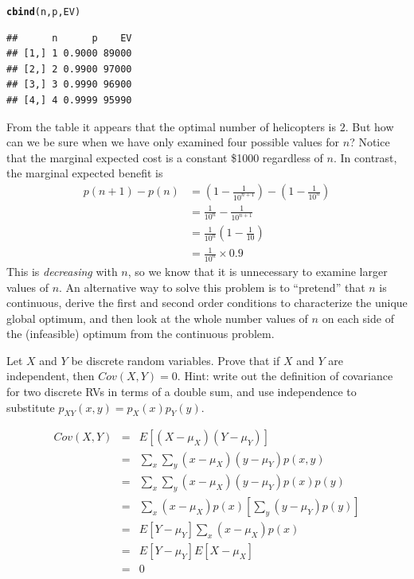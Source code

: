 \documentclass[addpoints,12pt]{exam}\usepackage[]{graphicx}\usepackage[]{xcolor}
\makeatletter
\newcommand{\hldef}[1]{\textcolor[rgb]{0.345,0.345,0.345}{#1}}%
\newcommand{\hlkwd}[1]{\textcolor[rgb]{0.737,0.353,0.396}{\textbf{#1}}}%
\newenvironment{kframe}{%
 \def\at@end@of@kframe{}%
 \ifinner\ifhmode%
  \def\at@end@of@kframe{\end{minipage}}%
  \begin{minipage}{\columnwidth}%
 \fi\fi%
 \def\FrameCommand##1{\hskip\@totalleftmargin \hskip-\fboxsep
 \colorbox{shadecolor}{##1}\hskip-\fboxsep
     \hskip-\linewidth \hskip-\@totalleftmargin \hskip\columnwidth}%
 \MakeFramed {\advance\hsize-\width
   \@totalleftmargin\z@ \linewidth\hsize
   \@setminipage}}%
 {\par\unskip\endMakeFramed%
 \at@end@of@kframe}
\newenvironment{knitrout}{}{} %
\makeatother
\begin{document}
\begin{questions}
\begin{solution}
\begin{knitrout}
\begin{kframe}
\begin{alltt}
\hlkwd{cbind}\hldef{(n,p,EV)}
\end{alltt}
\begin{verbatim}
##      n      p    EV
## [1,] 1 0.9000 89000
## [2,] 2 0.9900 97000
## [3,] 3 0.9990 96900
## [4,] 4 0.9999 95990
\end{verbatim}
\end{kframe}
\end{knitrout}
From the table it appears that the optimal number of helicopters is $2$.
But how can we be sure when we have only examined four possible values for $n$?
Notice that the marginal expected cost is a constant \$1000 regardless of $n$.
In contrast, the marginal expected benefit is
\begin{align*}
  p(n+1) - p(n) &= \left( 1 - \frac{1}{10^{n+1}} \right) - \left( 1 - \frac{1}{10^{n}} \right) \\
  &= \frac{1}{10^{n}} - \frac{1}{10^{n+1}}\\
  &= \frac{1}{10^{n}}\left(1 - \frac{1}{10} \right) \\
  &= \frac{1}{10^n} \times 0.9
\end{align*}
This is \emph{decreasing} with $n$, so we know that it is unnecessary to examine larger values of $n$.
An alternative way to solve this problem is to ``pretend'' that $n$ is continuous, derive the first and second order conditions to characterize the unique global optimum, and then look at the whole number values of $n$ on each side of the (infeasible) optimum from the continuous problem.

  \end{solution}



\question Let $X$ and $Y$ be discrete random variables.
Prove that if $X$ and $Y$ are independent, then $Cov(X,Y) = 0$. 
Hint: write out the definition of covariance for two discrete RVs in terms of a double sum, and use independence to substitute $p_{XY}(x,y) = p_X(x)p_Y(y)$.
\begin{solution}
\begin{eqnarray*}
	Cov(X,Y) &=& E[(X-\mu_X)(Y-\mu_Y)]\\
	&=& \sum_x \sum_y (x - \mu_X)(y- \mu_Y)p(x,y)\\
	&=&\sum_x \sum_y (x - \mu_X)(y- \mu_Y)p(x)p(y) \\
	&=& \sum_x  (x - \mu_X)p(x)\left[ \sum_y (y- \mu_Y)p(y)\right] \\
	&=& E[Y- \mu_Y] \sum_x  (x - \mu_X)p(x)\\
	&=& E[Y- \mu_Y]E[X- \mu_X] \\
	&=& 0
\end{eqnarray*}
\end{solution}


\end{questions}
\end{document}
